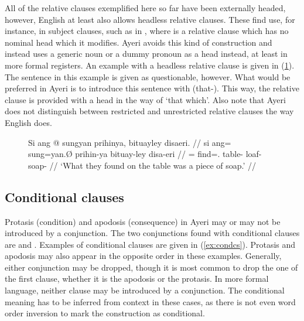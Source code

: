 All of the relative clauses exemplified here so far have been externally
headed, however, English at least also allows headless relative clauses. These
find use, for instance, in subject clauses, such as in , where  is a
relative clause which has no nominal head which it modifies. Ayeri avoids this
kind of construction and instead uses a generic noun or a dummy pronoun as a
head instead, at least in more formal registers. An example with a headless
relative clause is given in (\ref{ex:relcheadless}). The sentence in this
example is given as questionable, however. What would be preferred in Ayeri is
to introduce this sentence with  (that-\AargI{}).
This way, the relative clause is provided with a head in the way of `that
which'. Also note that Ayeri does not distinguish between restricted and
unrestricted relative clauses the way English does.

\begin{figure}[h]
\ex\label{ex:relcheadless}%
\ljudge\ques\begingl
	\gla Si ang @ sungyan prihinya, bituayley disaeri. //
	\glb si ang= sung=yan.Ø prihin-ya bituay-ley disa-eri //
	\glc \Rel{} \AgtT{}= find=\TplM{}.\Top{} table-\Loc{} loaf-\PargI{}
		soap-\Ins{} //
	\glft `What they found on the table was a piece of soap.' //
\endgl
\xe
\end{figure}


\subsection{Conditional clauses}
\label{subsec:condcs}

Protasis (condition) and apodosis (consequence) in Ayeri may or may not be
introduced by a conjunction. The two conjunctions found with conditional
clauses are  and .
Examples of conditional clauses are given in (\ref{ex:condcs}). Protasis and
apodosis may also appear in the opposite order in these examples. Generally,
either conjunction may be dropped, though it is most common to drop the one of
the first clause, whether it is the apodosis or the protasis. In more formal
language, neither clause may be introduced by a conjunction. The conditional
meaning has to be inferred from context in these cases, as there is not even
word order inversion to mark the construction as conditional.

